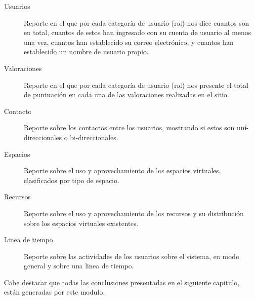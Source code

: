 \begin{description}
\item [Usuarios] Reporte en el que por cada categoría de usuario (rol) nos dice
cuantos son en total, cuantos de estos han ingresado con su cuenta de usuario
al menos una vez, cuantos han establecido su correo electrónico, y cuantos han
establecido un nombre de usuario propio.
\item [Valoraciones] Reporte en el que por cada categoría de usuario (rol) nos
presente el total de puntuación en cada una de las valoraciones realizadas en el
sitio.
\item [Contacto] Reporte sobre los contactos entre los usuarios, mostrando si
estos son uní-direccionales o bi-direccionales.
\item [Espacios] Reporte sobre el uso y aprovechamiento de los espacios
virtuales, clasificados por tipo de espacio.
\item [Recursos] Reporte sobre el uso y aprovechamiento de los recursos y su
distribución sobre los espacios virtuales existentes.
\item [Linea de tiempo] Reporte sobre las actividades de los usuarios sobre el
sistema, en modo general y sobre una linea de tiempo.
\end{description}

Cabe destacar que todas las conclusiones presentadas en el siguiente capitulo,
están generadas por este modulo.

